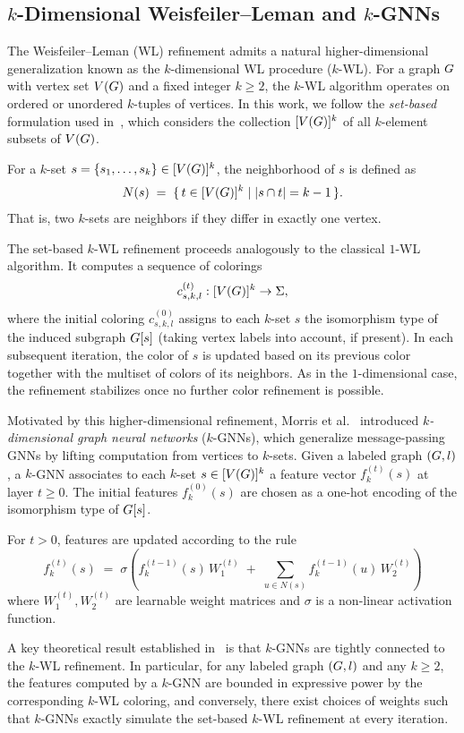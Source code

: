 \subsection{$k$-Dimensional Weisfeiler--Leman and $k$-GNNs}

The Weisfeiler--Leman (WL) refinement admits a natural higher-dimensional generalization known as the $k$-dimensional WL procedure ($k$-WL). For a graph $G$ with vertex set $V(G)$ and a fixed integer $k \ge 2$, the $k$-WL algorithm operates on ordered or unordered $k$-tuples of vertices. In this work, we follow the \emph{set-based} formulation used in~\cite{MorrisEtAl2019}, which considers the collection $[V(G)]^k$ of all $k$-element subsets of $V(G)$.

For a $k$-set $s = \{s_1,\dots,s_k\} \in [V(G)]^k$, the neighborhood of $s$ is defined as
\[
N(s) \;=\; \{\, t \in [V(G)]^k \mid |s \cap t| = k-1 \,\}.
\]
That is, two $k$-sets are neighbors if they differ in exactly one vertex.

The set-based $k$-WL refinement proceeds analogously to the classical $1$-WL algorithm. It computes a sequence of colorings
\[
c^{(t)}_{s,k,l} : [V(G)]^k \rightarrow \Sigma,
\]
where the initial coloring $c^{(0)}_{s,k,l}$ assigns to each $k$-set $s$ the isomorphism type of the induced subgraph $G[s]$ (taking vertex labels into account, if present). In each subsequent iteration, the color of $s$ is updated based on its previous color together with the multiset of colors of its neighbors. As in the $1$-dimensional case, the refinement stabilizes once no further color refinement is possible.

Motivated by this higher-dimensional refinement, Morris et al.~\cite{MorrisEtAl2019} introduced \emph{$k$-dimensional graph neural networks} ($k$-GNNs), which generalize message-passing GNNs by lifting computation from vertices to $k$-sets. Given a labeled graph $(G,l)$, a $k$-GNN associates to each $k$-set $s \in [V(G)]^k$ a feature vector $f_k^{(t)}(s)$ at layer $t \ge 0$. The initial features $f_k^{(0)}(s)$ are chosen as a one-hot encoding of the isomorphism type of $G[s]$.

For $t > 0$, features are updated according to the rule
\[
f_k^{(t)}(s)
\;=\;
\sigma\!\left(
f_k^{(t-1)}(s)\, W_1^{(t)}
\;+\;
\sum_{u \in N(s) } f_k^{(t-1)}(u)\, W_2^{(t)}
\right)
\]
where $W_1^{(t)}, W_2^{(t)}$ are learnable weight matrices and $\sigma$ is a non-linear activation function. 

A key theoretical result established in~\cite{MorrisEtAl2019} is that $k$-GNNs are tightly connected to the $k$-WL refinement. In particular, for any labeled graph $(G,l)$ and any $k \ge 2$, the features computed by a $k$-GNN are bounded in expressive power by the corresponding $k$-WL coloring, and conversely, there exist choices of weights such that $k$-GNNs exactly simulate the set-based $k$-WL refinement at every iteration.

